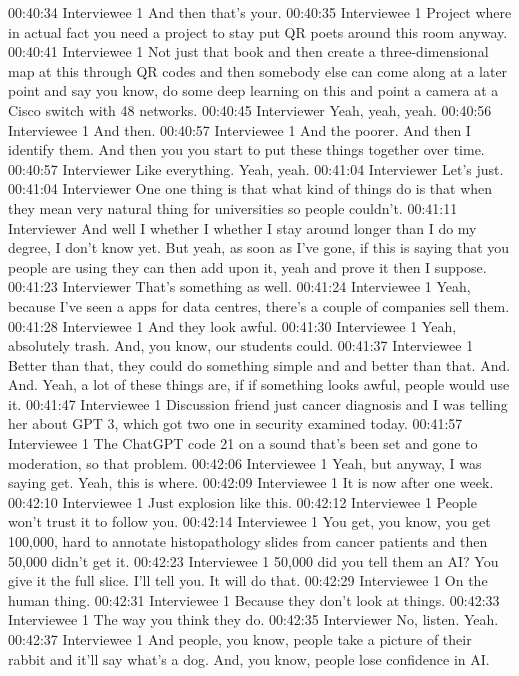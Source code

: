 00:40:34 Interviewee 1
And then that's your.
00:40:35 Interviewee 1
Project where in actual fact you need a project to stay put QR poets around this room anyway.
00:40:41 Interviewee 1
Not just that book and then create a three-dimensional map at this through QR codes and then somebody else can come along at a later point and say you know, do some deep learning on this and point a camera at a Cisco switch with 48 networks.
00:40:45 Interviewer
Yeah, yeah, yeah.
00:40:56 Interviewee 1
And then.
00:40:57 Interviewee 1
And the poorer. And then I identify them. And then you you start to put these things together over time.
00:40:57 Interviewer
Like everything. Yeah, yeah.
00:41:04 Interviewer
Let's just.
00:41:04 Interviewer
One one thing is that what kind of things do is that when they mean very natural thing for universities so people couldn't.
00:41:11 Interviewer
And well I whether I whether I stay around longer than I do my degree, I don't know yet. But yeah, as soon as I've gone, if this is saying that you people are using they can then add upon it, yeah and prove it then I suppose.
00:41:23 Interviewer
That's something as well.
00:41:24 Interviewee 1
Yeah, because I've seen a apps for data centres, there's a couple of companies sell them.
00:41:28 Interviewee 1
And they look awful.
00:41:30 Interviewee 1
Yeah, absolutely trash. And, you know, our students could.
00:41:37 Interviewee 1
Better than that, they could do something simple and and better than that. And. And. Yeah, a lot of these things are, if if something looks awful, people would use it.
00:41:47 Interviewee 1
Discussion friend just cancer diagnosis and I was telling her about GPT 3, which got two one in security examined today.
00:41:57 Interviewee 1
The ChatGPT code 21 on a sound that's been set and gone to moderation, so that problem.
00:42:06 Interviewee 1
Yeah, but anyway, I was saying get. Yeah, this is where.
00:42:09 Interviewee 1
It is now after one week.
00:42:10 Interviewee 1
Just explosion like this.
00:42:12 Interviewee 1
People won't trust it to follow you.
00:42:14 Interviewee 1
You get, you know, you get 100,000, hard to annotate histopathology slides from cancer patients and then 50,000 didn't get it.
00:42:23 Interviewee 1
50,000 did you tell them an AI? You give it the full slice. I'll tell you. It will do that.
00:42:29 Interviewee 1
On the human thing.
00:42:31 Interviewee 1
Because they don't look at things.
00:42:33 Interviewee 1
The way you think they do.
00:42:35 Interviewer
No, listen. Yeah.
00:42:37 Interviewee 1
And people, you know, people take a picture of their rabbit and it'll say what's a dog. And, you know, people lose confidence in AI.
